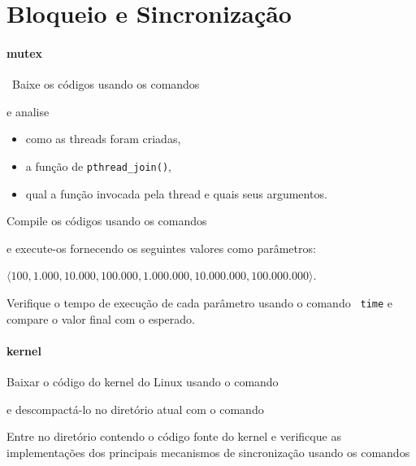 
\section*{Bloqueio e Sincronização}

\paragraph{mutex}~Baixe os códigos usando os comandos\medskip


\noindent e analise

\begin{itemize}
\item como as threads foram criadas,
\item a função de {\tt pthread\_join()},
\item qual a função invocada pela thread e quais seus argumentos.
\end{itemize}

\noindent Compile os códigos usando os comandos\medskip


\noindent e execute-os fornecendo os seguintes valores como
parâmetros:

\begin{center}
  $\langle 100, 1.000, 10.000, 100.000, 1.000.000, 10.000.000, 100.000.000 \rangle$.
\end{center}

\noindent Verifique o tempo de execução de cada parâmetro usando o comando {\tt
  time} e compare o valor final com o esperado.

\paragraph{kernel}

Baixar o código do kernel do Linux usando o comando 


\noindent e descompactá-lo no diretório atual com o comando


\noindent Entre no diretório contendo o código fonte do kernel e
verificque as implementações dos principais mecanismos de
sincronização usando os comandos


